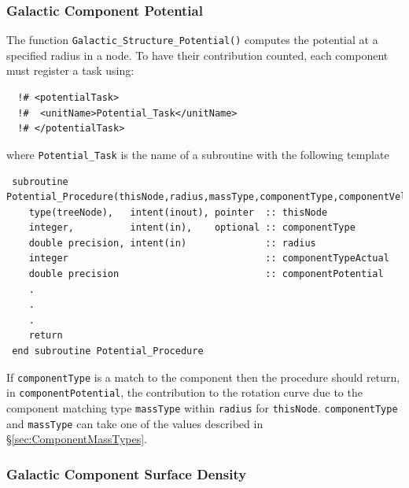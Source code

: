 \subsubsection{Galactic Component Potential}

The function {\tt Galactic\_Structure\_Potential()} computes the potential at a specified radius in a node. To have their contribution counted, each component must register a task using:
\begin{verbatim}
  !# <potentialTask>
  !#  <unitName>Potential_Task</unitName>
  !# </potentialTask>
\end{verbatim}
where {\tt Potential\_Task} is the name of a subroutine with the following template
\begin{verbatim}
 subroutine Potential_Procedure(thisNode,radius,massType,componentType,componentVelocity)
    type(treeNode),   intent(inout), pointer  :: thisNode
    integer,          intent(in),    optional :: componentType  
    double precision, intent(in)              :: radius
    integer                                   :: componentTypeActual  
    double precision                          :: componentPotential
    .
    .
    .
    return
 end subroutine Potential_Procedure
\end{verbatim}
If {\tt componentType} is a match to the component then the procedure should return, in {\tt componentPotential}, the contribution to the rotation curve due to the component matching type {\tt massType} within {\tt radius} for {\tt thisNode}. {\tt componentType} and {\tt massType} can take one of the values described in \S\ref{sec:ComponentMassTypes}.

\subsubsection{Galactic Component Surface Density}

